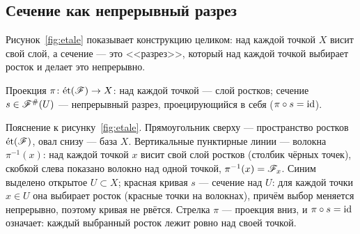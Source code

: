 \subsection{Сечение как непрерывный разрез}
Рисунок~\ref{fig:etale} показывает конструкцию целиком: над каждой
точкой $X$ висит свой слой, а сечение --- это <<разрез>>, который над
каждой точкой выбирает росток и делает это непрерывно.

\begin{risunok}{Проекция $\pi\colon\et(\Shv{F})\to X$: над каждой
 точкой --- слой ростков; сечение $s\in\Shv{F}^{\#}(U)$ --- непрерывный
 разрез, проецирующийся в себя ($\pi\circ s=\id$).\label{fig:etale}}
\end{risunok}

Пояснение к рисунку~\ref{fig:etale}. Прямоугольник сверху ---
пространство ростков $\et(\Shv{F})$, овал снизу --- база $X$.
Вертикальные пунктирные линии --- волокна $\pi^{-1}(x)$: над
каждой точкой $x$ висит свой слой ростков (столбик чёрных точек),
скобкой слева показано волокно над одной точкой,
$\pi^{-1}(x)=\Shv{F}_x$. Синим выделено открытое $U\subset X$;
красная кривая $s$ --- сечение над $U$: для каждой точки $x\in U$
она выбирает росток (красные точки на волокнах), причём выбор
меняется непрерывно, поэтому кривая не рвётся. Стрелка $\pi$
--- проекция вниз, и $\pi\circ s=\id$ означает: каждый выбранный
росток лежит ровно над своей точкой.


